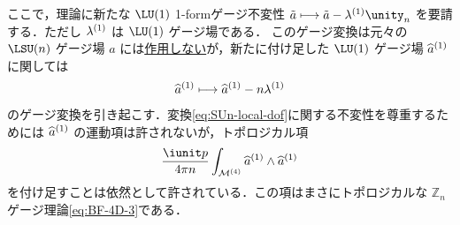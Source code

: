 \documentclass[TQFT_main]{subfiles}
\begin{document}
ここで，理論に新たな $\LU (1)$ 1-formゲージ不変性 $\tilde{a} \lmto \tilde{a} - \hg{\lambda}{1} \unity_n$ を要請する．ただし $\lambda^{(1)}$ は $\LU(1)$ ゲージ場である．
このゲージ変換は元々の $\LSU (n)$ ゲージ場 $a$ には\underline{作用しない}が，新たに付け足した $\LU (1)$ ゲージ場 $\widehat{a}^{(1)}$ に関しては
\begin{align}
    \label{eq:SUn-local-dof}
    \widehat{a}^{(1)} \longmapsto \widehat{a}^{(1)} - n \lambda^{(1)}
\end{align}
のゲージ変換を引き起こす．変換\eqref{eq:SUn-local-dof}に関する不変性を尊重するためには $\widehat{a}^{(1)}$ の運動項は許されないが，トポロジカル項
\begin{align}
    \frac{\iunit p}{4\pi n} \int_{\mfdcal{M}{4}} \hg{\widehat{a}}{1} \wedge \hg{\widehat{a}}{1}
\end{align}
を付け足すことは依然として許されている．この項はまさにトポロジカルな $\mathbb{Z}_n$ ゲージ理論\eqref{eq:BF-4D-3}である．
\end{document}
